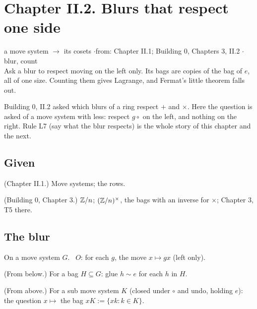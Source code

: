 \section*{Chapter II.2. Blurs that respect one side}
\begin{center}
{\normalsize a move system $\to$ its cosets \quad$\cdot$\quad from: Chapter II.1; Building 0, Chapters 3, II.2 \quad$\cdot$\quad blur, count}\\[4pt]
{\small Ask a blur to respect moving on the left only. Its bags are copies of the bag of $e$, all of one size. Counting them gives Lagrange, and Fermat's little theorem falls out.}
\end{center}

Building 0, II.2 asked which blurs of a ring respect $+$ and $\times$. Here the question is asked of a move system with less: respect $g \circ$ on the left, and nothing on the right. Rule L7 (say what the blur respects) is the whole story of this chapter and the next.

\subsection*{Given}

\begin{lines}
\item[\lab{G1}] (Chapter II.1.) Move systems; the rows.
\item[\lab{G2}] (Building 0, Chapter 3.) $\mathbb{Z}/n$; $(\mathbb{Z}/n)^\times$, the bags with an inverse for $\times$; Chapter 3, T5 there.
\end{lines}

\subsection*{The blur}

On a move system $G$. \ $O$: for each $g$, the move $x \mapsto g x$ (left only).

\begin{lines}
\item[\lab{B1}] (From below.) For a bag $H \subseteq G$: glue $h \sim e$ for each $h$ in $H$.
\item[\lab{B2}] (From above.) For a sub move system $K$ (closed under $\circ$ and undo, holding $e$): the question $x \mapsto$ the bag $xK := \{x k : k \in K\}$.
\end{lines}

